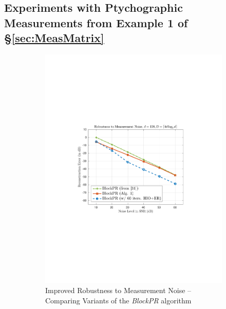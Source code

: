 \subsection{Experiments with Ptychographic Measurements from Example 1 of \S \ref{sec:MeasMatrix}}
\label{sec:PtychographicMeasExper}

%
\begin{figure}[hbtp]
\centering
\begin{subfigure}[b]{0.495\textwidth}
\centering
\includegraphics[clip=true, trim = 1.5in 3.35in 1.25in 3.25in,scale=0.59]{pics/fig6a}
\caption{Improved Robustness to Measurement Noise -- Comparing Variants of the {\em BlockPR}
algorithm}
\label{fig:global_vs_local_ptych}
\end{subfigure}
\hfill
\begin{subfigure}[b]{0.495\textwidth}
\centering

\end{subfigure}
\end{figure}

